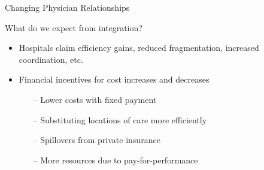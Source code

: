 \documentclass[t]{beamer}
\begin{document}
\begin{frame}{Changing Physician Relationships}
\end{frame}

\begin{frame}{What do we expect from integration?}
    \begin{itemize}
        \item Hospitals claim efficiency gains, reduced fragmentation, increased coordination, etc.
        \item Financial incentives for cost increases and decreases
        \begin{itemize}
            \item[--] Lower costs with fixed payment
            \item[--] Substituting locations of care more efficiently
            \item[--] Spillovers from private insurance
            \item[--] More resources due to pay-for-performance
        \end{itemize}
    \end{itemize}
\end{frame}
\end{document}
